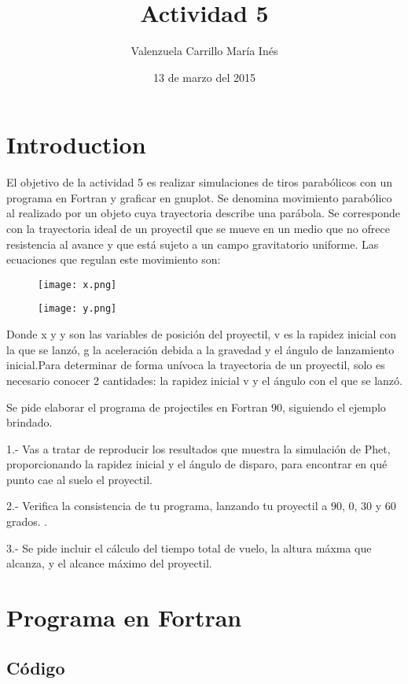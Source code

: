 \documentclass[a4paper]{article}
\title{Actividad 5}
\author{Valenzuela Carrillo María Inés}
\date{13 de marzo del 2015}
\begin{document}
\maketitle


\section{Introduction}
El objetivo de la actividad 5 es realizar simulaciones de tiros parabólicos con un programa en Fortran y graficar en gnuplot.
Se denomina movimiento parabólico al realizado por un objeto cuya trayectoria describe una parábola. Se corresponde con la trayectoria ideal de un proyectil que se mueve en un medio que no ofrece resistencia al avance y que está sujeto a un campo gravitatorio uniforme.
Las ecuaciones que regulan este movimiento son:

\begin{figure}[h]
\centering
\texttt{[image: x.png]}
\end{figure}

\begin{figure}[h]
\centering
\texttt{[image: y.png]}
\end{figure}

Donde x y y son las variables de posición del proyectil, v es la rapidez inicial con la que se lanzó, g la aceleración debida a la gravedad y el ángulo de lanzamiento inicial.Para determinar de forma unívoca la trayectoria de un proyectil, solo es necesario conocer 2 cantidades: la rapidez inicial v y el ángulo con el que se lanzó.

Se pide elaborar el programa de projectiles en Fortran 90, siguiendo el ejemplo brindado.

1.- Vas a tratar de reproducir los resultados que muestra la simulación de Phet, proporcionando la rapidez inicial y el  ángulo de disparo, para encontrar en qué punto cae al suelo el proyectil.

2.- Verifica la consistencia de tu programa, lanzando tu proyectil a 90, 0, 30 y 60 grados. .

3.- Se pide incluir el cálculo del tiempo total de vuelo, la altura máxma que alcanza, y el alcance máximo del proyectil.



\section{Programa en Fortran}


\subsection{Código}
\end{document}
